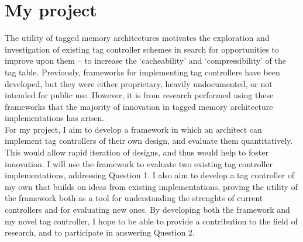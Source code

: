 \section{My project}
The utility of tagged memory architectures motivates the exploration and investigation of existing tag controller schemes in search for opportunities to improve upon them -- to increase the `cacheability' and `compressibility' of the tag table. Previously, frameworks for implementing tag controllers have been developed, but they were either proprietary, heavily undocumented, or not intended for public use.
However, it is from research performed using these frameworks that the majority of innovation in tagged memory architecture implementations has arisen.\\
For my project, I aim to develop a framework in which an architect can implement tag controllers of their own design, and evaluate them quantitatively. This would allow rapid iteration of designs, and thus would help to foster innovation. I will use the framework to evaluate two existing tag controller implementations, addressing Question 1. I also aim to develop a tag controller of my own that builds on ideas from existing implementations, proving the utility of the framework both as a tool for understanding the strenghts of current controllers and for evaluating new ones. By developing both the framework and my novel tag controller, I hope to be able to provide a contribution to the field of research, and to participate in answering Question 2.

